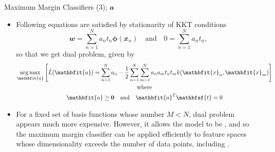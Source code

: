 \documentclass{bredelebeamer}
\DeclareMathOperator*{\argmax}{arg\,max}
\begin{document}
\begin{frame}{Maximum Margin Classifiers (3); $\mathbfit{a}$}
  \begin{itemize}
    \item Following equations are satisfied by stationarity of KKT conditions
    \begin{equation}
        \mathbfit{w} = \sum_{n=1}^N a_n t_n \boldsymbol{\phi}(\mathbfit{x}_n)
        \quad \textrm{and} \quad
        0 = \sum_{n=1}^N a_n t_n,
    \end{equation}
    so that we get dual problem, given by
    \begin{equation}
      \begin{gathered}
        \argmax_{\mathbfit{a}}
        \left[
        \tilde{L}(\mathbfit{a}) = \sum_{n=1}^{N} a_n
        - \frac{1}{2} \sum_{n=1}^{N}\sum_{m=1}^{N} a_n a_m t_n t_m k(\mathbfit{x}_n, \mathbfit{x}_m)
        \right]\\
        \textrm{where} \\
        \mathbfit{a} \geq \mathbf{0} \quad \textrm{and} \quad
        \mathbfit{a}^T \mathbfsf{t} = 0
      \end{gathered}
    \end{equation}
    \item For a fixed set of basis functions whose number $M < N$, dual problem
    appears much more expensive. However, it allows the model to be
    , and so the maximum margin
    classifier can be applied efficiently to feature spaces whose
    dimensionality exceeds the number of data points, including
    .
  \end{itemize}
\end{frame}
\end{document}

